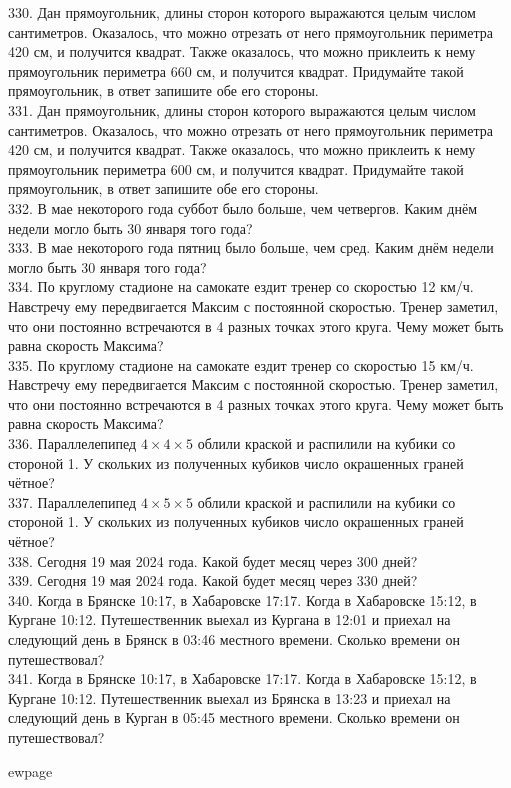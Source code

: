 330. Дан прямоугольник, длины сторон которого выражаются целым числом сантиметров. Оказалось, что можно отрезать от него прямоугольник периметра 420 см, и получится квадрат. Также оказалось, что можно приклеить к нему прямоугольник периметра 660 см, и получится квадрат. Придумайте такой прямоугольник, в ответ запишите обе его стороны.\\
331. Дан прямоугольник, длины сторон которого выражаются целым числом сантиметров. Оказалось, что можно отрезать от него прямоугольник периметра 420 см, и получится квадрат. Также оказалось, что можно приклеить к нему прямоугольник периметра 600 см, и получится квадрат. Придумайте такой прямоугольник, в ответ запишите обе его стороны.\\
332. В мае некоторого года суббот было больше, чем четвергов. Каким днём недели могло быть 30 января того года?\\
333. В мае некоторого года пятниц было больше, чем сред. Каким днём недели могло быть 30 января того года?\\
334. По круглому стадионе на самокате ездит тренер со скоростью 12 км/ч. Навстречу ему передвигается Максим с постоянной скоростью. Тренер заметил, что они постоянно встречаются в 4 разных точках этого круга. Чему может быть равна скорость Максима?\\
335. По круглому стадионе на самокате ездит тренер со скоростью 15 км/ч. Навстречу ему передвигается Максим с постоянной скоростью. Тренер заметил, что они постоянно встречаются в 4 разных точках этого круга. Чему может быть равна скорость Максима?\\
336. Параллелепипед $4\times4\times5$ облили краской и распилили на кубики со стороной 1. У скольких из полученных кубиков число окрашенных граней чётное?\\
337. Параллелепипед $4\times5\times5$ облили краской и распилили на кубики со стороной 1. У скольких из полученных кубиков число окрашенных граней чётное?\\
338. Сегодня 19 мая 2024 года. Какой будет месяц через 300 дней?\\
339. Сегодня 19 мая 2024 года. Какой будет месяц через 330 дней?\\
340. Когда в Брянске 10:17, в Хабаровске 17:17. Когда в Хабаровске 15:12, в Кургане 10:12. Путешественник выехал из Кургана в 12:01 и приехал на следующий день в Брянск в 03:46 местного времени. Сколько времени он путешествовал?\\
341. Когда в Брянске 10:17, в Хабаровске 17:17. Когда в Хабаровске 15:12, в Кургане 10:12. Путешественник выехал из Брянска в 13:23 и приехал на следующий день в Курган в 05:45 местного времени. Сколько времени он путешествовал?

ewpage
